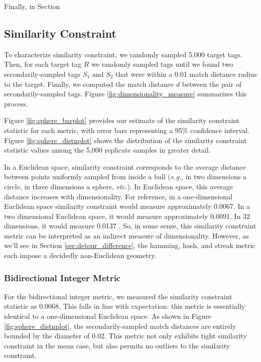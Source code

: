 Finally, in Section

\subsection{Similarity Constraint} \label{sec:similarityconstriant}



To characterize similarity constraint, we randomly sampled 5,000 target tags.
Then, for each target tag $R$ we randomly sampled tags until we found two secondarily-sampled tags $S_1$ and $S_2$ that were within a 0.01 match distance radius to the target.
Finally, we computed the match distance $d$ between the pair of secondarily-sampled tags.
Figure \ref{fig:dimensionality_measure} summarizes this process.

Figure \ref{fig:sphere_barplot} provides our estimate of the similarity constraint statistic for each metric, with error bars representing a 95\% confidence interval.
Figure \ref{fig:sphere_distnplot} shows the distribution of the similarity constraint statistic values among the 5,000 replicate samples in greater detail.

In a Euclidean space, similarity constraint corresponds to the average distance between points uniformly sampled from inside a ball (\textit{e.g.}, in two dimensions a circle, in three dimensions a sphere, \textit{etc.}).
In Euclidean space, this average distance increases with dimensionality.
For reference, in a one-dimensional Euclidean space similarity constraint would measure approximately 0.0067.
In a two dimensional Euclidean space, it would measure approximately  0.0091.
In 32 dimensions, it would measure 0.0137 \citep{dunbar1997average}.
So, in some sense, this similarity constraint metric can be interpreted as an indirect measure of dimensionality.
However, as we'll see in Section \ref{sec:detour_difference}, the hamming, hash, and streak metric each impose a decidedly non-Euclidean geometry.

\subsubsection{Bidirectional Integer Metric}

For the bidirectional integer metric, we measured the similarity constraint statistic as 0.0068.
This falls in line with expectation: this metric is essentially identical to a one-dimensional Euclidean space.
As shown in Figure \ref{fig:sphere_distnplot}, the secondarily-sampled match distances are entirely bounded by the diameter of 0.02.
This metric not only exhibits tight similarity constraint in the mean case, but also permits no outliers to the similarity constraint.

